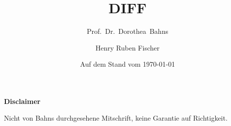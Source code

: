 \documentclass{hrflecture}
\title{DIFF \Romannum{2}}
\subtitle{Prof.~Dr.~Dorothea~Bahns}
\date{Auf dem Stand vom \today}
\author{Henry Ruben Fischer}
\begin{document}
\maketitle

\newpage
\textbf{Disclaimer}
\vspace{1cm}

Nicht von Bahns durchgesehene Mitschrift, keine Garantie auf Richtigkeit.

\newpage
\tableofcontents
\newpage


\end{document}
